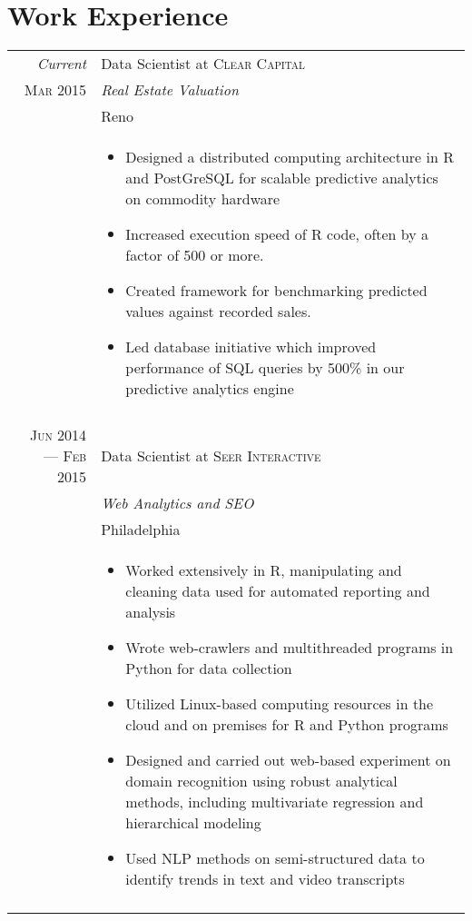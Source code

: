 \documentclass[a4paper,10pt]{article}
\begin{document}
\section{Work Experience}
\begin{tabular}{r|p{11cm}}
 \emph{Current} & Data Scientist at \textsc{Clear Capital} \\ 
 \textsc{Mar 2015}&\emph{Real Estate Valuation}\\ 
 &Reno\\
 &\footnotesize{\begin{itemize}
 		\item{Designed a distributed computing architecture in R and PostGreSQL for scalable predictive analytics on commodity hardware}
 		\item{Increased execution speed of R code, often by a factor of 500 or more.}
 		\item{Created framework for benchmarking predicted values against recorded sales.}
 		\item{Led database initiative which improved performance of SQL queries by 500\% in our predictive analytics engine}
 	\end{itemize}}\\\multicolumn{2}{c}{} \\ 	
 \textsc{Jun 2014 --- Feb 2015} & Data Scientist at \textsc{Seer Interactive} \\
 &\emph{Web Analytics and SEO}\\
 & Philadelphia \\
 &\footnotesize{\begin{itemize}
 		\item{Worked extensively in R, manipulating and cleaning data used for automated reporting and analysis}
 		\item{Wrote web-crawlers and multithreaded programs in Python for data collection}
 		\item{Utilized Linux-based computing resources in the cloud and on premises for R and Python programs}
 		\item{Designed and carried out web-based experiment on domain recognition using robust analytical methods, including multivariate regression and hierarchical modeling}
 		\item{Used NLP methods on semi-structured data to identify trends in text and video transcripts}
 	\end{itemize}}\\\multicolumn{2}{c}{} \\	


\end{tabular}
\end{document}
